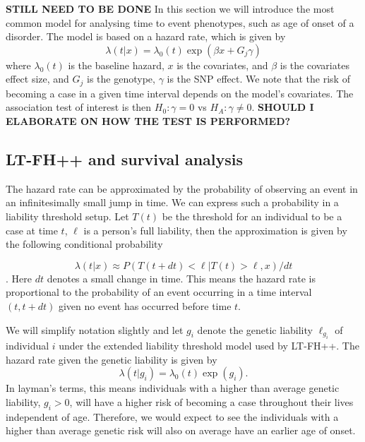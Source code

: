 \textbf{STILL NEED TO BE DONE}
In this section we will introduce the most common model for analysing time to event phenotypes, such as age of onset of a disorder. The model is based on a hazard rate, which is given by 
\begin{equation}
	\lambda(t | x) = \lambda_0(t)\exp(\beta x + G_j\gamma)
\end{equation}
where $ \lambda_0(t) $ is the baseline hazard, $ x $ is the covariates, and $ \beta $ is the covariates effect size, and $ G_j $ is the genotype, $ \gamma $ is the SNP effect. We note that the risk of becoming a case in a given time interval depends on the model's covariates. The association test of interest is then $ H_0: \gamma = 0 $ vs $ H_A: \gamma \neq 0 $.
\textbf{SHOULD I ELABORATE ON HOW THE TEST IS PERFORMED?}


\subsection{LT-FH++ and survival analysis}
The hazard rate can be approximated by the probability of observing an event in an infinitesimally small jump in time\cite{kragh2021analysis}. We can express such a probability in a liability threshold setup. Let $ T(t) $ be the threshold for an individual to be a case at time $ t $, $ \ell $ is a person's full liability, then the approximation is given by the following conditional probability

\begin{equation}\label{eq:ltm_case_prob_approx}
	\lambda(t|x) \approx 
	P(T(t + dt) < \ell | T(t) > \ell, x) / dt
\end{equation}.
Here $ dt $ denotes a small change in time. This means the hazard rate is proportional to the probability of an event occurring in a time interval $ (t, t + dt) $ given no event has occurred before time $ t $.

We will simplify notation slightly and let $ g_i $ denote the genetic liability $ \ell_{g_i} $ of individual $ i $ under the extended liability threshold model used by LT-FH++. The hazard rate given the genetic liability is given by
\begin{equation}
	\lambda(t | g_i) = \lambda_0(t) \exp(g_i).
\end{equation}
In layman's terms, this means individuals with a higher than average genetic liability, $ g_i > 0 $, will have a higher risk of becoming a case throughout their lives independent of age. Therefore, we would expect to see the individuals with a higher than average genetic risk will also on average have an earlier age of onset.

